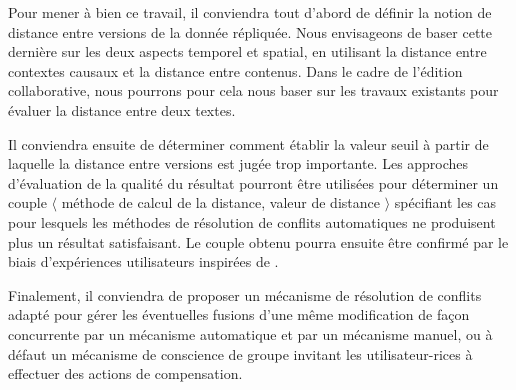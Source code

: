 Pour mener à bien ce travail, il conviendra tout d'abord de définir la notion de distance entre versions de la donnée répliquée.
Nous envisageons de baser cette dernière sur les deux aspects temporel et spatial, \ie en utilisant la distance entre contextes causaux et la distance entre contenus.
Dans le cadre de l'édition collaborative, nous pourrons pour cela nous baser sur les travaux existants pour évaluer la distance entre deux textes.

Il conviendra ensuite de déterminer comment établir la valeur seuil à partir de laquelle la distance entre versions est jugée trop importante.
Les approches d'évaluation de la qualité du résultat \cite{2016-quality-assessment-wikipedia-articles-dang} pourront être utilisées pour déterminer un couple $\langle$ méthode de calcul de la distance, valeur de distance $\rangle$ spécifiant les cas pour lesquels les méthodes de résolution de conflits automatiques ne produisent plus un résultat satisfaisant.
Le couple obtenu pourra ensuite être confirmé par le biais d'expériences utilisateurs inspirées de \cite{2014-effect-delay-collaborative-editing-ignat,2015-cope-delay-collaborative-note-taking-ignat}.


Finalement, il conviendra de proposer un mécanisme de résolution de conflits adapté pour gérer les éventuelles fusions d'une même modification de façon concurrente par un mécanisme automatique et par un mécanisme manuel, ou à défaut un mécanisme de conscience de groupe invitant les utilisateur-rices à effectuer des actions de compensation.
